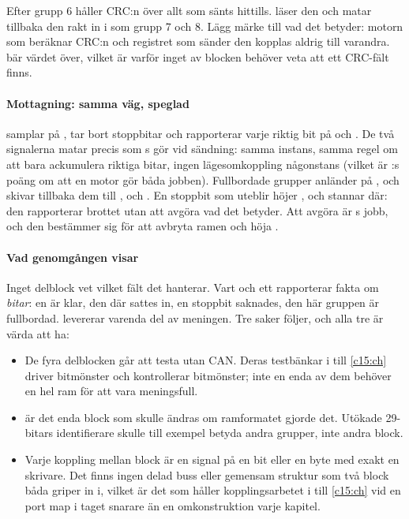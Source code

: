 Efter grupp 6 håller  CRC:n över allt som sänts hittills.  läser
den och matar tillbaka den rakt in i  som grupp 7 och 8. Lägg märke till vad det
betyder: motorn som beräknar CRC:n och registret som sänder den kopplas aldrig till varandra.
 bär värdet över, vilket är varför inget av blocken behöver veta att ett
CRC-fält finns.

\paragraph{Mottagning: samma väg, speglad}
 samplar  på , tar bort stoppbitar och
rapporterar varje riktig bit på  och . De två signalerna matar
 precis som s gör vid sändning: samma instans, samma regel om att
bara ackumulera riktiga bitar, ingen lägesomkoppling någonstans (vilket är :s poäng
om att en motor gör båda jobben). Fullbordade grupper anländer på , och
 skivar tillbaka dem till ,  och . En
stoppbit som uteblir höjer , och  stannar där: den rapporterar
brottet utan att avgöra vad det betyder. Att avgöra är s jobb, och den bestämmer
sig för att avbryta ramen och höja .

\paragraph{Vad genomgången visar}
Inget delblock vet vilket fält det hanterar. Vart och ett rapporterar fakta om \emph{bitar}: en är
klar, den där sattes in, en stoppbit saknades, den här gruppen är fullbordad. 
levererar varenda del av meningen. Tre saker följer, och alla tre är värda att ha:
\begin{itemize}
  \item De fyra delblocken går att testa utan CAN. Deras testbänkar i  till
    \ref{c15:ch} driver bitmönster och kontrollerar bitmönster; inte en enda av dem behöver en hel
    ram för att vara meningsfull.
  \item {} är det enda block som skulle ändras om ramformatet gjorde det. Utökade
    29-bitars identifierare skulle till exempel betyda andra grupper, inte andra block.
  \item Varje koppling mellan block är en signal på en bit eller en byte med exakt en skrivare. Det
    finns ingen delad buss eller gemensam struktur som två block båda griper in i, vilket är det som
    håller kopplingsarbetet i  till \ref{c15:ch} vid en port map i taget snarare än
    en omkonstruktion varje kapitel.
\end{itemize}

